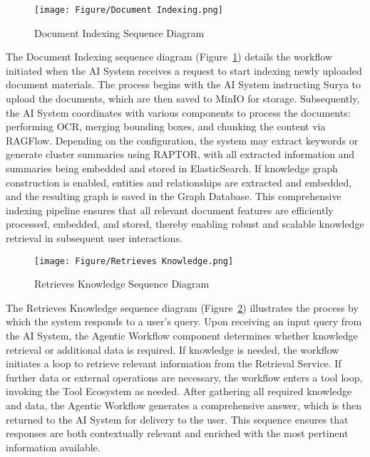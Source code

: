 \documentclass[../Main.tex]{subfiles}
\begin{document}
	\begin{figure}[H]
		\centering
		\texttt{[image: Figure/Document Indexing.png]}
		\caption{Document Indexing Sequence Diagram}
		\label{fig:Document_Indexing_Sequence_Diagram}
	\end{figure}

	The Document Indexing sequence diagram (Figure~\ref{fig:Document_Indexing_Sequence_Diagram})
	details the workflow initiated when the AI System receives a request to start indexing
	newly uploaded document materials. The process begins with the AI System
	instructing Surya to upload the documents, which are then saved to MinIO for storage.
	Subsequently, the AI System coordinates with various components to process the
	documents: performing OCR, merging bounding boxes, and chunking the content
	via RAGFlow. Depending on the configuration, the system may extract keywords
	or generate cluster summaries using RAPTOR, with all extracted information and
	summaries being embedded and stored in ElasticSearch. If knowledge graph
	construction is enabled, entities and relationships are extracted and embedded,
	and the resulting graph is saved in the Graph Database. This comprehensive indexing
	pipeline ensures that all relevant document features are efficiently processed,
	embedded, and stored, thereby enabling robust and scalable knowledge retrieval
	in subsequent user interactions.

	\begin{figure}[H]
		\centering
		\texttt{[image: Figure/Retrieves Knowledge.png]}
		\caption{Retrieves Knowledge Sequence Diagram}
		\label{fig:Retrieves_Knowledge_Sequence_Diagram}
	\end{figure}

	The Retrieves Knowledge sequence diagram (Figure~\ref{fig:Retrieves_Knowledge_Sequence_Diagram})
	illustrates the process by which the system responds to a user's query. Upon
	receiving an input query from the AI System, the Agentic Workflow component determines
	whether knowledge retrieval or additional data is required. If knowledge is
	needed, the workflow initiates a loop to retrieve relevant information from the
	Retrieval Service. If further data or external operations are necessary, the workflow
	enters a tool loop, invoking the Tool Ecosystem as needed. After gathering all
	required knowledge and data, the Agentic Workflow generates a comprehensive
	answer, which is then returned to the AI System for delivery to the user. This
	sequence ensures that responses are both contextually relevant and enriched
	with the most pertinent information available.
\end{document}
